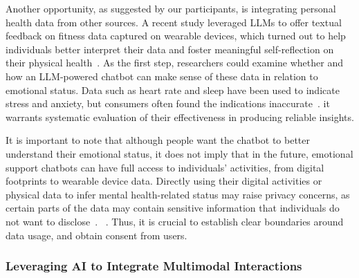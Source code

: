 Another opportunity, as suggested by our participants, is integrating personal health data from other sources. A recent study leveraged LLMs to offer textual feedback on fitness data captured on wearable devices, which turned out to help individuals better interpret their data and foster meaningful self-reflection on their physical health~\cite{Konstantin2024fitness}. As the first step, researchers could examine whether and how an LLM-powered chatbot can make sense of these data in relation to emotional status. Data such as heart rate and sleep have been used to indicate stress and anxiety, but consumers often found the indications inaccurate~\cite{ding2021data}. 
 it warrants systematic evaluation of their effectiveness in producing reliable insights. 

 It is important to note that although people want the chatbot to better understand their emotional status, it does not imply that in the future, emotional support chatbots can have full access to individuals' activities, from digital footprints to wearable device data. Directly using their digital activities or physical data to infer mental health-related status may raise privacy concerns, as certain parts of the data may contain sensitive information that individuals do not want to disclose~\cite{naslund2019risks, can2021privacy}. 
~\cite{Akter2022Bias, Hamdoun2023Risk}. 
Thus, it is crucial to establish clear boundaries around data usage,  and obtain consent from users. 


\vspace{-2mm}
\subsubsection{Leveraging AI to Integrate Multimodal Interactions}

